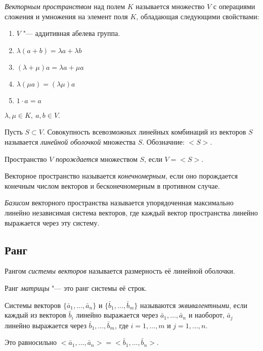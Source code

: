 \begin{definition}
    \textit{Векторным пространством} над полем $K$ называется множество $V$ с операциями сложения и умножения на элемент поля $K$, обладающая следующими свойствами:
    \begin{enumerate}
        \item $V$ "--- аддитивная абелева группа.
        \item $\lambda(a + b) = \lambda a + \lambda b$
        \item $(\lambda + \mu)a = \lambda a + \mu a$
        \item $\lambda(\mu a) = (\lambda \mu)a$
        \item $1 \cdot a = a$
    \end{enumerate}
    $\lambda,\mu \in K,~a,b \in V$.
\end{definition}

\begin{definition}
    Пусть $S \subset V$. Совокупность всевозможных линейных комбинаций из векторов $S$ называется \textit{линейной оболочкой} множества $S$. Обозначние: $<\!S\!>$.
\end{definition}
Пространство $V$ \textit{порождается} множеством $S$, если $V = <\!S\!>$.

\begin{definition}
    Векторное пространство называется \textit{конечномерным}, если оно порождается конечным числом векторов и бесконечномерным в противном случае.
\end{definition}
\begin{definition}
    \textit{Базисом} векторного пространства называется упорядоченная максимально линейно независимая система векторов, где каждый вектор пространства линейно выражается через эту систему.    
\end{definition}

\subsection*{Ранг}
\begin{definition}
    Рангом \textit{системы векторов} называется размерность её линейной оболочки.

    Ранг \textit{матрицы} "--- это ранг системы её строк.
\end{definition}
\begin{definition}
    Системы векторов $\{\bar{a}_1, \ldots, \bar{a}_n\}$ и $\{\bar{b}_1, \ldots, \bar{b}_m\}$ называются \textit{эквивалентными}, если каждый из векторов $\bar{b}_i$ линейно выражается через $\bar{a}_1, \ldots, \bar{a}_n$ и наоборот,
    $\bar{a}_j$ линейно выражается через $\bar{b}_1, \ldots, \bar{b}_m$, где $i = 1,\ldots,m$ и $j = 1,\ldots, n$.

    Это равносильно $<\!\bar{a}_1, \ldots, \bar{a}_n\!> = <\!\bar{b}_1, \ldots, \bar{b}_n\!>$.
\end{definition}

